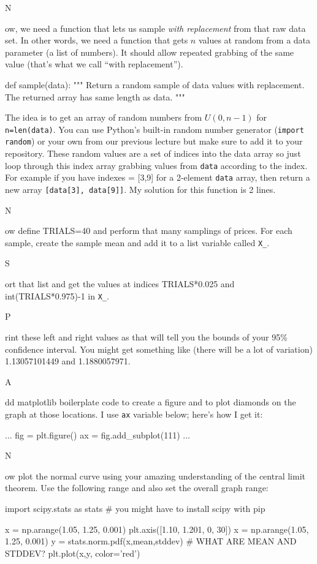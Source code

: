 \documentclass[titlepage]{tufte-book}
\newcounter{problem}
\newcommand{\step}[1]{{}
\vspace{4pt} \noindent {\bf \theproblem. }#1\addtocounter{problem}{1}}
\begin{document}
\begin{fullwidth}
\step Now, we need a function that lets us sample {\em with replacement} from that raw data set. In other words, we need a function that gets $n$ values at random from a data parameter (a list of numbers). It should allow repeated grabbing of the same value (that's what we call ``with replacement'').

\begin{pyverbatim}
def sample(data):
	"""
	Return a random sample of data values with replacement.
	The returned array has same length as data.
	"""
\end{pyverbatim}

The idea is to get an array of random numbers from $U(0,n-1)$ for {\tt n=len(data)}. You can use Python's built-in random number generator ({\tt import random}) or your own from our previous lecture but make sure to add it to your repository.  These random values are a set of indices into the data array so just loop through this index array grabbing values from {\tt data} according to the index. For example if you have indexes = [3,9] for a 2-element {\tt data} array, then return a new array {\tt [data[3], data[9]]}. My solution for this  function is 2 lines.

\step Now define TRIALS=40 and perform that many samplings of prices. For each sample, create the sample mean and add it to a list variable called {\tt X\_}.

\step Sort that list and get the values at indices TRIALS*0.025 and int(TRIALS*0.975)-1 in {\tt X\_}.

\step Print these left and right values as that will tell you the bounds of your 95\% confidence interval. You might get something like (there will be a lot of variation) 1.13057101449 and 1.1880057971.

\step Add matplotlib boilerplate code to create a figure and to plot diamonds on the graph at those locations.  I use {\tt ax} variable below; here's how I get it:
\begin{pyverbatim}
...
fig = plt.figure()
ax = fig.add_subplot(111)
...
\end{pyverbatim}
\step Now plot the normal curve using your amazing understanding of the central limit  theorem. Use the following range and also set the overall graph range:

\begin{pyverbatim}
import scipy.stats as stats # you might have to install scipy with pip

x = np.arange(1.05, 1.25, 0.001)
plt.axis([1.10, 1.201, 0, 30])
x = np.arange(1.05, 1.25, 0.001)
y = stats.norm.pdf(x,mean,stddev)  # WHAT ARE MEAN AND STDDEV?
plt.plot(x,y, color='red')
\end{pyverbatim}


\end{fullwidth}
\end{document}
